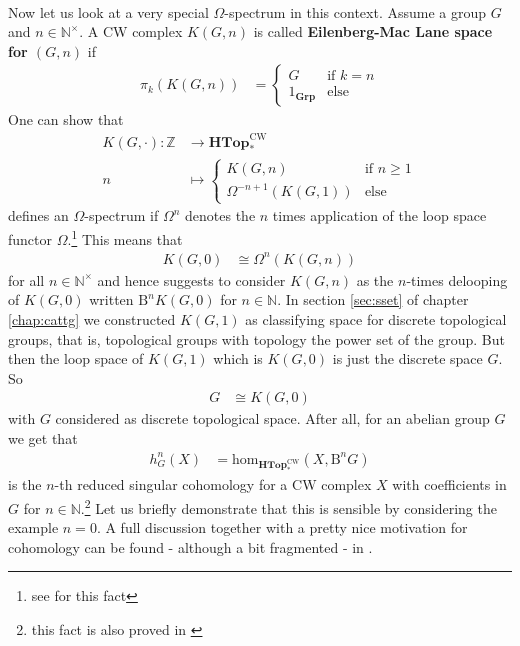 \\
Now let us look at a very special $\Omega$-spectrum in this context. Assume a group $G$ and $n \in \mathbb{N}^{\times}$. A CW complex $K(G,n)$ is called \textbf{Eilenberg-Mac Lane space for $(G,n)$} if
\begin{align*}
  \pi_{k}(K(G,n))
  &=
  \begin{cases}
    G
    &
    \text{if }
    k
    =
    n
    \\
    1_{\mathbf{Grp}}
    &
    \text{else}
  \end{cases}
\end{align*}
One can show that
\begin{align*}
  K(G,\cdot)
  \colon
  \mathbb{Z}
  &\rightarrow
  \mathbf{HTop}_{\ast}^{\textrm{CW}}
  \\
  n
  &\mapsto
  \begin{cases}
    K(G,n)
    &
    \text{if }
    n
    \geq
    1
    \\
    \Omega^{-n+1}(K(G,1))
    &
    \text{else}
  \end{cases}
\end{align*}
defines an $\Omega$-spectrum if $\Omega^{n}$ denotes the $n$ times application of the loop space functor $\Omega$.\footnote{see \cite{8b5861fc} for this fact} This means that
\begin{align*}
  K(G,0)
  &\cong
  \Omega^{n}(K(G,n))
\end{align*}
for all $n \in \mathbb{N}^{\times}$ and hence suggests to consider $K(G,n)$ as the $n$-times delooping of $K(G,0)$ written $\mathrm{B}^{n}K(G,0)$ for $n \in \mathbb{N}$. In section \ref{sec:sset} of chapter \ref{chap:cattg} we constructed $K(G,1)$ as classifying space for discrete topological groups, that is, topological groups with topology the power set of the group. But then the loop space of $K(G,1)$ which is $K(G,0)$ is just the discrete space $G$. So
\begin{align*}
  G
  &\cong
  K(G,0)
\end{align*}
with $G$ considered as discrete topological space. After all, for an abelian group $G$ we get that
\begin{align*}
  h_{G}^{n}(X)
  &=
  \mathrm{hom}_{\mathbf{HTop}_{\ast}^{\textrm{CW}}}
  \left(
    X,
    \mathrm{B}^{n}G
  \right)
\end{align*}
is the $n$-th reduced singular cohomology for a CW complex $X$ with coefficients in $G$ for $n \in \mathbb{N}$.\footnote{this fact is also proved in \cite{8b5861fc}} Let us briefly demonstrate that this is sensible by considering the example $n = 0$. A full discussion together with a pretty nice motivation for cohomology can be found - although a bit fragmented - in \cite{8b5861fc}.
